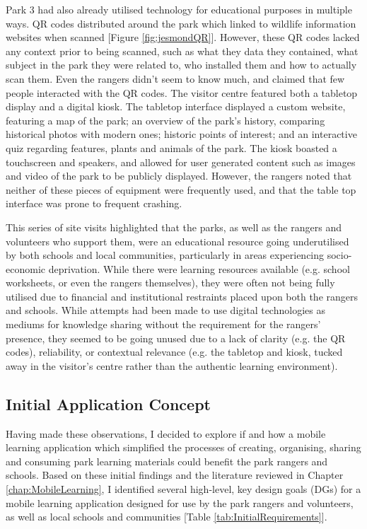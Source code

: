 Park 3 had also already utilised technology for educational purposes in multiple ways. QR codes distributed around the park which linked to wildlife information websites when scanned [Figure \ref{fig:jesmondQR}]. However, these QR codes lacked any context prior to being scanned, such as what they data they contained, what subject in the park they were related to, who installed them and how to actually scan them. Even the rangers didn't seem to know much, and claimed that few people interacted with the QR codes. The visitor centre featured both a tabletop display and a digital kiosk. The tabletop interface displayed a custom website, featuring a map of the park; an overview of the park's history, comparing historical photos with modern ones; historic points of interest; and an interactive quiz regarding features, plants and animals of the park. The kiosk boasted a touchscreen and speakers, and allowed for user generated content such as images and video of the park to be publicly displayed. However, the rangers noted that neither of these pieces of equipment were frequently used, and that the table top interface was prone to frequent crashing.

This series of site visits highlighted that the parks, as well as the rangers and volunteers who support them, were an educational resource going underutilised by both schools and local communities, particularly in areas experiencing socio-economic deprivation. While there were learning resources available (e.g. school worksheets, or even the rangers themselves), they were often not being fully utilised due to financial and institutional restraints placed upon both the rangers and schools. While attempts had been made to use digital technologies as mediums for knowledge sharing without the requirement for the rangers' presence, they seemed to be going unused due to a lack of clarity (e.g. the QR codes), reliability, or contextual relevance (e.g. the tabletop and kiosk, tucked away in the visitor's centre rather than the authentic learning environment).

\subsection{Initial Application Concept}

Having made these observations, I decided to explore if and how a mobile learning application which simplified the processes of creating, organising, sharing and consuming park learning materials could benefit the park rangers and schools. Based on these initial findings and the literature reviewed in Chapter \ref{chap:MobileLearning}, I identified several high-level, key design goals (DGs) for a mobile learning application designed for use by the park rangers and volunteers, as well as local schools and communities [Table \ref{tab:InitialRequirements}]. 

